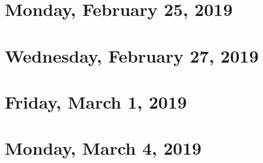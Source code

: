 \documentclass[reqno]{amsart}
\begin{document}
\section{Monday, February 25, 2019}
    

\section{Wednesday, February 27, 2019}
    

\section{Friday, March 1, 2019}
    

\section{Monday, March 4, 2019}
    
\end{document}
